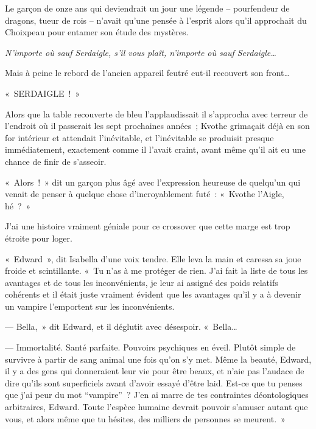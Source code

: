 \pagebreak[1]

Le garçon de onze ans qui deviendrait un jour une légende -- pourfendeur de dragons, tueur de rois -- n'avait qu'une pensée à l'esprit alors qu'il approchait du Choixpeau pour entamer son étude des mystères.

\emph{N'importe où sauf Serdaigle, s'il vous plaît, n'importe où sauf Serdaigle…}

Mais à peine le rebord de l'ancien appareil feutré eut-il recouvert son front…

«~SERDAIGLE~!~»

Alors que la table recouverte de bleu l'applaudissait il s'approcha avec terreur de l'endroit où il passerait les sept prochaines années~; Kvothe grimaçait déjà en son for intérieur et attendait l'inévitable, et l'inévitable se produisit presque immédiatement, exactement comme il l'avait craint, avant même qu'il ait eu une chance de finir de s'asseoir.

«~Alors~!~» dit un garçon plus âgé avec l'expression heureuse de quelqu'un qui venait de penser à quelque chose d'incroyablement futé~: «~Kvothe l'Aigle, hé~?~»\footnotemark{}

\pagebreak[1]

J'ai une histoire vraiment géniale pour ce crossover que cette marge est trop étroite pour loger.

\pagebreak[1]

«~Edward~», dit Isabella d'une voix tendre. Elle leva la main et caressa sa joue froide et scintillante. «~Tu n'as à me protéger de rien. J'ai fait la liste de tous les avantages et de tous les inconvénients, je leur ai assigné des poids relatifs cohérents et il était juste vraiment évident que les avantages qu'il y a à devenir un vampire l'emportent sur les inconvénients.

--- Bella,~» dit Edward, et il déglutit avec désespoir. «~Bella…

--- Immortalité. Santé parfaite. Pouvoirs psychiques en éveil. Plutôt simple de survivre à partir de sang animal une fois qu'on s'y met. Même la beauté, Edward, il y a des gens qui donneraient leur vie pour être beaux, et n'aie pas l'audace de dire qu'ils sont superficiels avant d'avoir essayé d'être laid. Est-ce que tu penses que j'ai peur du mot “vampire”~? J'en ai marre de tes contraintes déontologiques arbitraires, Edward. Toute l'espèce humaine devrait pouvoir s'amuser autant que vous, et alors même que tu hésites, des milliers de personnes se meurent.~»

